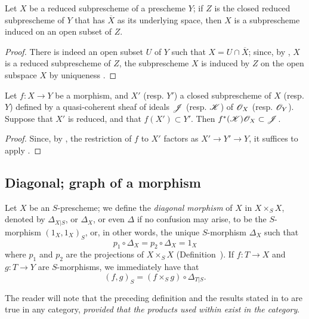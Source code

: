 \begin{prop}[5.2.2]
\label{1.5.2.2}
Let $X$ be a reduced subprescheme of a prescheme $Y$; if $Z$ is the closed reduced subprescheme of $Y$ that has $\overline{X}$ as its underlying space, then $X$ is a subprescheme induced on an open subset of $Z$.
\end{prop}

\begin{proof}
\label{proof-1.5.2.2}
There is indeed an open subset $U$ of $Y$ such that $X=U\cap\overline{X}$;
since, by , $X$ is a reduced subprescheme of $Z$, the subprescheme $X$ is induced by $Z$ on the open subspace $X$ by uniqueness .
\end{proof}

\begin{cor}[5.2.4]
\label{1.5.2.4}
Let $f:X\to Y$ be a morphism, and $X'$ (resp. $Y'$) a closed subprescheme of $X$ (resp. $Y$) defined by a quasi-coherent sheaf of ideals $\mathscr{J}$ (resp. $\mathscr{K}$) of $\mathscr{O}_X$ (resp. $\mathscr{O}_Y$).
Suppose that $X'$ is reduced, and that $f(X')\subset Y'$.
Then $f^*(\mathscr{K})\mathscr{O}_X\subset\mathscr{J}$.
\end{cor}

\begin{proof}
\label{proof-1.5.2.4}
Since, by , the restriction of $f$ to $X'$ factors as $X'\to Y'\to Y$, it suffices to apply .
\end{proof}

\subsection{Diagonal; graph of a morphism}
\label{subsection:diagonal-graph-of-a-morphism}

\begin{env}[5.3.1]
\label{1.5.3.1}
Let $X$ be an $S$-prescheme;
we define the \emph{diagonal morphism} of $X$ in $X\times_S X$, denoted by $\Delta_{X|S}$, or $\Delta_X$, or even $\Delta$ if no confusion may arise, to be the $S$-morphism $(1_X,1_X)_S$, or, in other words, the unique $S$-morphism $\Delta_X$ such that
\[
    p_1\circ\Delta_X=p_2\circ\Delta_X=1_X\tag{5.3.1.1}
\]
where $p_1$ and $p_2$ are the projections of $X\times_S X$ (Definition~).
If $f:T\to X$ and $g:T\to Y$ are $S$-morphisms, we immediately have that
\[
    (f,g)_S=(f\times_S g)\circ\Delta_{T|S}.\tag{5.3.1.2}
\]

The reader will note that the preceding definition and the results stated in  to  are true in any category, \emph{provided that the products used within exist in the category}.
\end{env}


